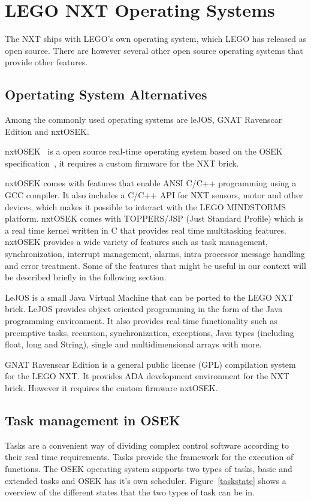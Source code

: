 \section{LEGO NXT Operating Systems}
The NXT ships with LEGO's own operating system, which LEGO has released as open source. There are however several other open source operating systems that provide other features. 

\subsection{Opertating System Alternatives} %
\label{sub:opertating_system_alternatives}
Among the commonly used operating systems are leJOS, GNAT Ravenscar Edition and nxtOSEK.

nxtOSEK~\cite{osek_os} is a open source real-time operating system based on the OSEK specification~\cite{osek_spec}, it requires a custom firmware for the NXT brick.

nxtOSEK comes with features that enable ANSI C/C++ programming using a GCC compiler. It also includes a C/C++ API for NXT sensors, motor and other devices, which makes it possible to interact with the LEGO MINDSTORMS platform. nxtOSEK comes with TOPPERS/JSP (Just Standard Profile) which is a real time kernel written in C that provides real time multitasking features. nxtOSEK provides a wide variety of features such as task management, synchronization, interrupt management, alarms, intra processor message handling and error treatment. Some of the features that might be useful in our context will be described briefly in the following section. 

LeJOS is a small Java Virtual Machine that can be ported to the LEGO NXT brick\cite{lejos}. LeJOS provides object oriented programming in the form of the Java programming environment. It also provides real-time functionality such as preemptive tasks, recursion, synchronization, exceptions, Java types (including float, long and String), single and multidimensional arrays with more. 

GNAT Ravenscar Edition is a general public license (GPL) compilation system for the LEGO NXT. It provides ADA development environment for the NXT brick. However it requires the custom firmware nxtOSEK\cite{ada}.

\subsection{Task management in OSEK} %
\label{sub:task_management_in_osek}
Tasks are a convenient way of dividing complex control software according to their real time requirements. Tasks provide the framework for the execution of functions. 
The OSEK operating system supports two types of tasks, basic and extended tasks and OSEK has it's own scheduler. Figure~\ref{taskstate} shows a overview of the different states that the two types of task can be in.

